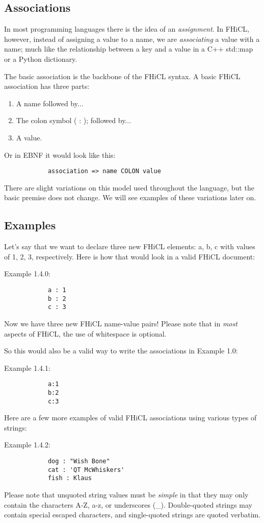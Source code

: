 \documentclass{article}
\begin{document}
	\subsection{Associations}
		In most programming languages there is the idea of an \emph{assignment}. 
		In FHiCL, however, instead of assigning a value to a name, 
		we are \emph{associating} a value with a name; 
		much like the relationship between a key and a value in a C++ std::map or a Python dictionary.
		\par
		The basic association is the backbone of the FHiCL syntax.
		A basic FHiCL association has three parts:
		\begin{enumerate}
			\item A name followed by...
			\item The colon symbol ( : ); followed by...
			\item A value.
		\end{enumerate}
		\par
		Or in EBNF it would look like this:
		\begin{verbatim}
			association => name COLON value
		\end{verbatim}
		\par
		There are slight variations on this model used throughout the language,
		but the basic premise does not change. 
		We will see examples of these variations later on.
	\subsection{Examples}
		Let's say that we want to declare three new FHiCL elements: a, b, c
		with values of 1, 2, 3, respectively. 
		Here is how that would look in a valid FHiCL document:
		\par
		Example 1.4.0:
		\begin{verbatim}
			a : 1
			b : 2
			c : 3
		\end{verbatim}
		\par
		Now we have three new FHiCL name-value pairs!
		Please note that in \emph{most} aspects of FHiCL,
		the use of whitespace is optional.
		\par
		So this would also be a valid way to write the associations in Example 1.0:
		\par
		Example 1.4.1:
		\begin{verbatim}
			a:1
			b:2
			c:3
		\end{verbatim} 
 		\par
		Here are a few more examples of valid FHiCL associations using various types of strings:
		\par
		Example 1.4.2:
		\begin{verbatim}
			dog : "Wish Bone"
			cat : 'QT McWhiskers'
			fish : Klaus
		\end{verbatim}
		Please note that unquoted string values must be \emph{simple} in that they may only contain
		the characters A-Z, a-z, or underscores (\_).
		Double-quoted strings may contain special escaped characters,
		and single-quoted strings are quoted verbatim.
\end{document}
